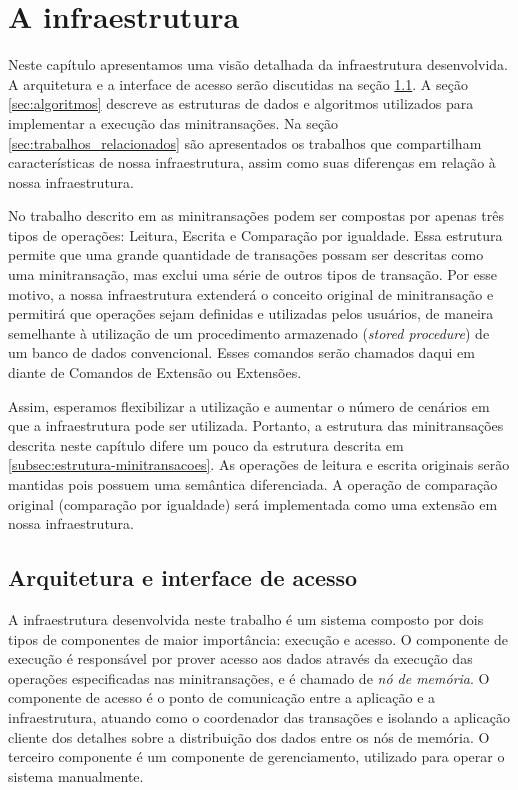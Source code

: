 \documentclass[11pt,twoside,a4paper]{book}
\begin{document}
\chapter{A infraestrutura}
\label{chap:implementacao}
Neste capítulo apresentamos uma visão detalhada da infraestrutura desenvolvida. A arquitetura e a interface de acesso serão discutidas na seção \ref{sec:arquitetura}. A seção \ref{sec:algoritmos} descreve as estruturas de dados e algoritmos utilizados para implementar a execução das minitransações. Na seção \ref{sec:trabalhos_relacionados} são apresentados os trabalhos que compartilham características de nossa infraestrutura, assim como suas diferenças em relação à nossa infraestrutura. 

No trabalho descrito em \cite{sinfonia} as minitransações podem ser compostas por apenas três tipos de operações: Leitura, Escrita e Comparação por igualdade. Essa estrutura permite que uma grande quantidade de transações possam ser descritas como uma minitransação, mas exclui uma série de outros tipos de transação. Por esse motivo, a nossa infraestrutura extenderá o conceito original de minitransação e permitirá que operações sejam definidas e utilizadas pelos usuários, de maneira semelhante à utilização de um procedimento armazenado (\emph{stored procedure}) de um banco de dados convencional. Esses comandos serão chamados daqui em diante de Comandos de Extensão ou Extensões.

Assim, esperamos flexibilizar a utilização e aumentar o número de cenários em que a infraestrutura pode ser utilizada. Portanto, a estrutura das minitransações descrita neste capítulo difere um pouco da estrutura descrita em \ref{subsec:estrutura-minitransacoes}. As operações de leitura e escrita originais serão mantidas pois possuem uma semântica diferenciada. A operação de comparação original (comparação por igualdade) será implementada como uma extensão em nossa infraestrutura.

\section{Arquitetura e interface de acesso}
\label{sec:arquitetura}

A infraestrutura desenvolvida neste trabalho é um sistema composto por dois tipos de componentes de maior importância: execução e acesso. O componente de execução é responsável por prover acesso aos dados através da execução das operações especificadas nas minitransações, e é chamado de \emph{nó de memória}. O componente de acesso é o ponto de comunicação entre a aplicação e a infraestrutura, atuando como o coordenador das transações e isolando a aplicação cliente dos detalhes sobre a distribuição dos dados entre os nós de memória. O terceiro componente é um componente de gerenciamento, utilizado para operar o sistema manualmente.
\end{document}
